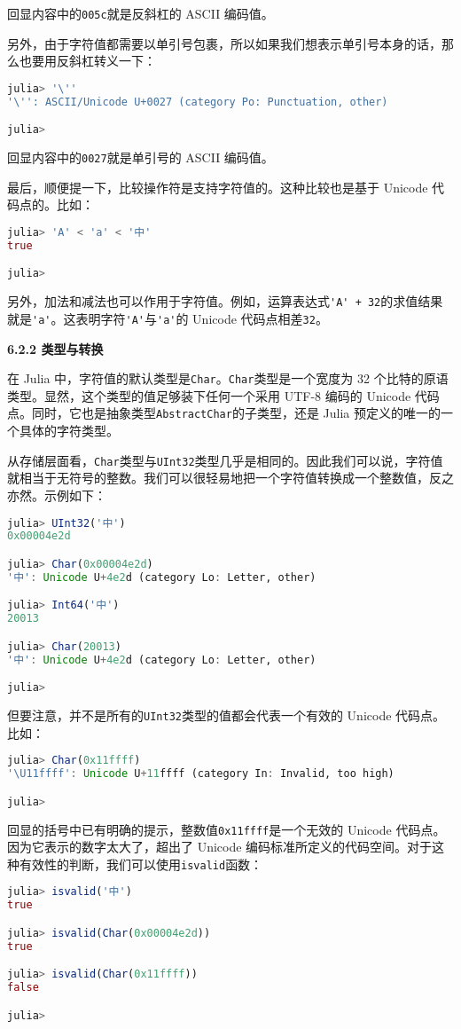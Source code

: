 回显内容中的\verb`005c`就是反斜杠的 ASCII 编码值。

另外，由于字符值都需要以单引号包裹，所以如果我们想表示单引号本身的话，那么也要用反斜杠转义一下：
\begin{lstlisting}[language=julia]
julia> '\''
'\'': ASCII/Unicode U+0027 (category Po: Punctuation, other)

julia> 
\end{lstlisting}

回显内容中的\verb`0027`就是单引号的 ASCII 编码值。

最后，顺便提一下，比较操作符是支持字符值的。这种比较也是基于 Unicode 代码点的。比如：
\begin{lstlisting}[language=julia]
julia> 'A' < 'a' < '中'
true

julia> 
\end{lstlisting}

另外，加法和减法也可以作用于字符值。例如，运算表达式\verb`'A' + 32`的求值结果就是\verb`'a'`。这表明字符\verb`'A'`与\verb`'a'`的 Unicode 代码点相差\verb`32`。

\textbf{6.2.2 类型与转换}

在 Julia 中，字符值的默认类型是\verb`Char`。\verb`Char`类型是一个宽度为 32 个比特的原语类型。显然，这个类型的值足够装下任何一个采用 UTF-8 编码的 Unicode 代码点。同时，它也是抽象类型\verb`AbstractChar`的子类型，还是 Julia 预定义的唯一的一个具体的字符类型。

从存储层面看，\verb`Char`类型与\verb`UInt32`类型几乎是相同的。因此我们可以说，字符值就相当于无符号的整数。我们可以很轻易地把一个字符值转换成一个整数值，反之亦然。示例如下：
\begin{lstlisting}[language=julia]
julia> UInt32('中')
0x00004e2d

julia> Char(0x00004e2d)
'中': Unicode U+4e2d (category Lo: Letter, other) 

julia> Int64('中')
20013

julia> Char(20013)
'中': Unicode U+4e2d (category Lo: Letter, other)

julia> 
\end{lstlisting}

但要注意，并不是所有的\verb`UInt32`类型的值都会代表一个有效的 Unicode 代码点。比如：
\begin{lstlisting}[language=julia]
julia> Char(0x11ffff)
'\U11ffff': Unicode U+11ffff (category In: Invalid, too high)

julia> 
\end{lstlisting}

回显的括号中已有明确的提示，整数值\verb`0x11ffff`是一个无效的 Unicode 代码点。因为它表示的数字太大了，超出了 Unicode 编码标准所定义的代码空间。对于这种有效性的判断，我们可以使用\verb`isvalid`函数：
\begin{lstlisting}[language=julia]
julia> isvalid('中')
true

julia> isvalid(Char(0x00004e2d))
true

julia> isvalid(Char(0x11ffff))
false

julia> 
\end{lstlisting}

